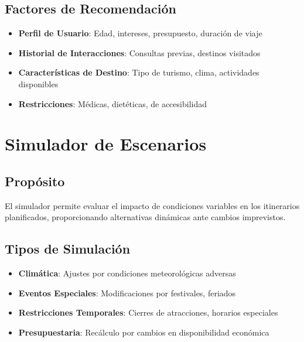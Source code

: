 \documentclass[runningheads]{llncs}
\begin{document}
\subsection{Factores de Recomendación}

\begin{itemize}
\item \textbf{Perfil de Usuario}: Edad, intereses, presupuesto, duración de viaje
\item \textbf{Historial de Interacciones}: Consultas previas, destinos visitados
\item \textbf{Características de Destino}: Tipo de turismo, clima, actividades disponibles
\item \textbf{Restricciones}: Médicas, dietéticas, de accesibilidad
\end{itemize}

\section{Simulador de Escenarios}

\subsection{Propósito}

El simulador permite evaluar el impacto de condiciones variables en los itinerarios planificados, proporcionando alternativas dinámicas ante cambios imprevistos.

\subsection{Tipos de Simulación}

\begin{itemize}
\item \textbf{Climática}: Ajustes por condiciones meteorológicas adversas
\item \textbf{Eventos Especiales}: Modificaciones por festivales, feriados
\item \textbf{Restricciones Temporales}: Cierres de atracciones, horarios especiales
\item \textbf{Presupuestaria}: Recálculo por cambios en disponibilidad económica
\end{itemize}
\end{document}

